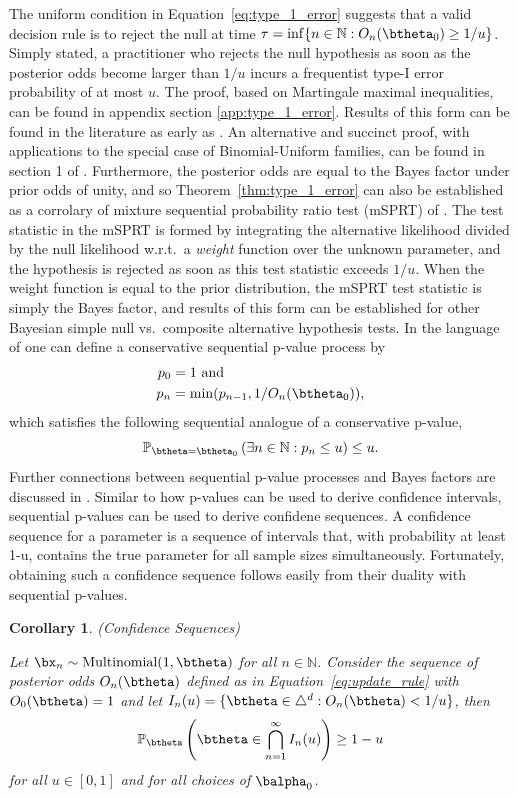 \documentclass[11pt]{article}
\newtheorem{cor}{Corollary}[section]
\begin{document}
The uniform condition in Equation~\ref{eq:type_1_error} suggests that a valid decision rule is to reject the null at time $\tau = \inf \lbrace n \in \mathbb{N}: O_n(\btheta_0) \geq 1/u \rbrace$.
Simply stated, a practitioner who rejects the null hypothesis as soon as the posterior odds become larger than $1/u$ incurs a frequentist type-I error probability of at most $u$.
The proof, based on Martingale maximal inequalities, can be found in appendix section \ref{app:type_1_error}.
Results of this form can be found in the literature as early as \cite{ville}.
An alternative and succinct proof, with applications to the special case of Binomial-Uniform families, can be found in section 1 of \cite{robbins}.
Furthermore, the posterior odds are equal to the Bayes factor under prior odds of unity, and so Theorem~\ref{thm:type_1_error} can also be established as a corrolary of mixture sequential probability ratio test (mSPRT) of \cite{wald}.
The test statistic in the mSPRT is formed by integrating the alternative likelihood divided by the null likelihood w.r.t.\ a \textit{weight} function over the unknown parameter, and the hypothesis is rejected as soon as this test statistic exceeds $1/u$.
When the weight function is equal to the prior distribution, the mSPRT test statistic is simply the Bayes factor, and results of this form can be established for other Bayesian simple null vs.\ composite alternative hypothesis tests.
In the language of \cite{johari} one can define a conservative sequential p-value process by
\begin{align*}
  p_0 &=1 \text{ and}\\
  p_n &= \min(p_{n-1}, 1/O_n(\btheta_0)),
\end{align*}
which satisfies the following sequential analogue of a conservative p-value,
\begin{equation}
  \label{eq:conservative_p_value}
  \mathbb{P}_{\btheta = \btheta_0}\left( \exists n \in \mathbb{N}: p_n \leq u \right) \leq u.
\end{equation}
Further connections between sequential p-value processes and Bayes factors are discussed in \cite{shafer}.
Similar to how p-values can be used to derive confidence intervals, sequential p-values can be used to derive confidene sequences.
A confidence sequence for a parameter is a sequence of intervals that, with probability at least 1-u, contains the true parameter for all sample sizes simultaneously.
Fortunately, obtaining such a confidence sequence follows easily from their duality with sequential p-values.
\begin{cor}(Confidence Sequences)
  \label{thm:confidence_sequence}

  \noindent Let $\bx_n\sim \mathrm{Multinomial}(1,\btheta)$ for all $n \in \mathbb{N}$.
Consider the sequence of posterior odds $O_n(\btheta)$ defined as in Equation~\ref{eq:update_rule} with $O_0(\btheta)=1$ and
 let $I_n(u) = \lbrace \btheta \in \triangle^d : O_n(\btheta) < 1/u  \rbrace$, then
\begin{equation}
  \label{eq:confidence_sequence}
  \mathbb{P}_{\btheta}\left( \btheta \in \bigcap_{n=1}^{\infty} I_n(u) \right) \geq 1- u
\end{equation}
for all $u \in [0,1]$ and for all choices of $\balpha_0$.
\end{cor}
\end{document}
